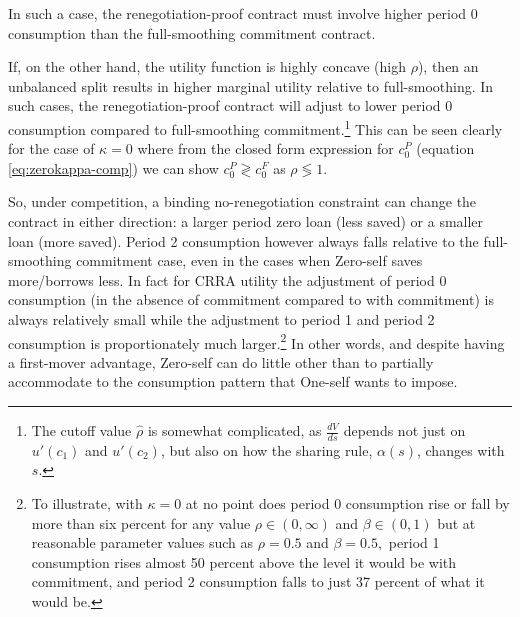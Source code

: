 \documentclass[11pt,english]{article}
\theoremstyle{plain}
\theoremstyle{definition}
\begin{document}
In such a case, the renegotiation-proof contract must involve higher
period 0 consumption than the full-smoothing commitment contract.

If, on the other hand, the utility function is highly concave (high
$\rho$), then an unbalanced split results in higher marginal utility
relative to full-smoothing. In such cases, the renegotiation-proof
contract will adjust to lower period 0 consumption compared to full-smoothing
commitment.\footnote{The  cutoff value $\hat{\rho}$ is somewhat
complicated, as $\frac{dV}{ds}$ depends not just on $u'\left(c_{1}\right)$
and $u'\left(c_{2}\right)$, but also on how the sharing rule, $\alpha\left(s\right)$,
changes with $s$.} This can be seen clearly for the case of $\kappa=0$ where from the closed form expression for \(c_0^P\) (equation
\ref{eq:zerokappa-comp}) we can show  \(c_{0}^{P} \gtrless c_{0}^{F} \) as \(\rho \lessgtr 1\).

So, under competition, a binding no-renegotiation constraint can
change the contract in either direction: a larger period zero loan (less saved)
or a smaller loan (more saved). Period 2 consumption however always
falls relative to the full-smoothing commitment case, even in the
cases when Zero-self saves more/borrows less. In fact for CRRA utility
the adjustment of period 0 consumption (in the absence of commitment
compared to with commitment) is always relatively small while the
adjustment to period 1 and period 2 consumption is proportionately much
larger.\footnote{To illustrate, with $\kappa=0$ at no point does period 0 consumption
rise or fall by more than six percent for any value $\rho\in(0,\infty)$
and $\beta\in(0,1)$ but at reasonable parameter values such as $\rho=0.5$
and $\beta=0.5,$  period 1 consumption
rises almost 50 percent above the level it would be with commitment, and
period 2 consumption falls to just 37 percent of what it would be.} In other words, and despite having a first-mover advantage, Zero-self
can do little other than to partially accommodate to the consumption
pattern that One-self wants to impose.
\end{document}
